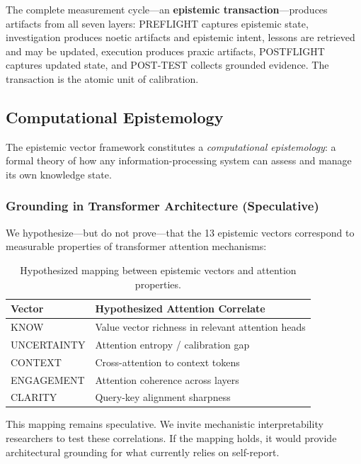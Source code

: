 The complete measurement cycle---an \textbf{epistemic transaction}---produces artifacts from all seven layers: PREFLIGHT captures epistemic state, investigation produces noetic artifacts and epistemic intent, lessons are retrieved and may be updated, execution produces praxic artifacts, POSTFLIGHT captures updated state, and POST-TEST collects grounded evidence. The transaction is the atomic unit of calibration.

\subsection{Computational Epistemology}

The epistemic vector framework constitutes a \emph{computational epistemology}: a formal theory of how any information-processing system can assess and manage its own knowledge state.

\subsubsection{Grounding in Transformer Architecture (Speculative)}

We hypothesize---but do not prove---that the 13 epistemic vectors correspond to measurable properties of transformer attention mechanisms:

\begin{table}[h]
\centering
\begin{tabular}{ll}
\toprule
\textbf{Vector} & \textbf{Hypothesized Attention Correlate} \\
\midrule
KNOW & Value vector richness in relevant attention heads \\
UNCERTAINTY & Attention entropy / calibration gap \\
CONTEXT & Cross-attention to context tokens \\
ENGAGEMENT & Attention coherence across layers \\
CLARITY & Query-key alignment sharpness \\
\bottomrule
\end{tabular}
\caption{Hypothesized mapping between epistemic vectors and attention properties.}
\label{tab:attention-mapping}
\end{table}

This mapping remains speculative. We invite mechanistic interpretability researchers to test these correlations. If the mapping holds, it would provide architectural grounding for what currently relies on self-report.

